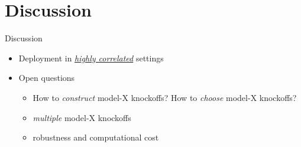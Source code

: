 \section{Discussion}

 \frame{\sectionpage}

\begin{frame}{Discussion}

    \begin{itemize}
        \item<2-> Deployment in \textcolor{glaucous!65!white}{\textit{\underline{highly correlated}}} settings
        \item<3-> Open questions 
        \begin{itemize}
            \item<4->[-] How to \textit{construct} model-X knockoffs? How to \textit{choose} model-X knockoffs?
            \item<5->[-] \textit{multiple} model-X knockoffs
            \item<6->[-] robustness and computational cost
        \end{itemize}
    \end{itemize}

\end{frame}

